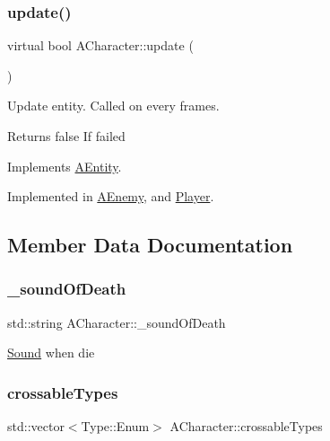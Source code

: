 \subsubsection{\texorpdfstring{update()}{update()}}
{\footnotesize\ttfamily virtual bool A\+Character\+::update (\begin{DoxyParamCaption}{ }\end{DoxyParamCaption})\hspace{0.3cm}{\ttfamily [pure virtual]}}



Update entity. Called on every frames. 

\begin{DoxyReturn}{Returns}
false If failed 
\end{DoxyReturn}


Implements \hyperlink{class_a_entity_adcfd3958ca43b8efd7cc58e7106a26a8}{A\+Entity}.



Implemented in \hyperlink{class_a_enemy_a01e3b0313d6f29bf2cafe20f711c0550}{A\+Enemy}, and \hyperlink{class_player_a1614c89caa50fa1527417ba6a2bbe6ee}{Player}.



\subsection{Member Data Documentation}
\mbox{\label{class_a_character_a5af6eac92ea7539809748b6f9e4be83b}} 
\subsubsection{\texorpdfstring{\+\_\+sound\+Of\+Death}{\_soundOfDeath}}
{\footnotesize\ttfamily std\+::string A\+Character\+::\+\_\+sound\+Of\+Death\hspace{0.3cm}{\ttfamily [protected]}}

\hyperlink{class_sound}{Sound} when die \mbox{\label{class_a_character_a0a3b42d22279b8c13c6e9eab4f74da7b}} 
\subsubsection{\texorpdfstring{crossable\+Types}{crossableTypes}}
{\footnotesize\ttfamily std\+::vector$<$Type\+::\+Enum$>$ A\+Character\+::crossable\+Types}


